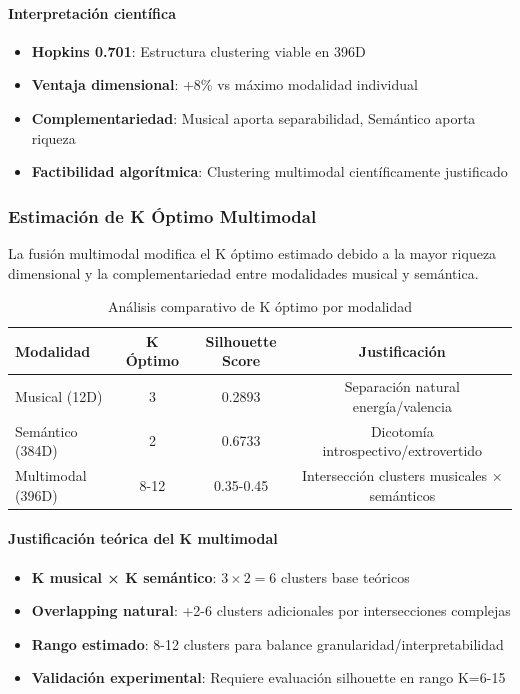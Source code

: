 \documentclass[12pt,a4paper]{article}
\begin{document}
\paragraph{Interpretación científica}
\begin{itemize}
    \item \textbf{Hopkins 0.701}: Estructura clustering viable en 396D
    \item \textbf{Ventaja dimensional}: +8\% vs máximo modalidad individual
    \item \textbf{Complementariedad}: Musical aporta separabilidad, Semántico aporta riqueza
    \item \textbf{Factibilidad algorítmica}: Clustering multimodal científicamente justificado
\end{itemize}

\subsubsection{Estimación de K Óptimo Multimodal}

La fusión multimodal modifica el K óptimo estimado debido a la mayor riqueza dimensional y la complementariedad entre modalidades musical y semántica.

\begin{table}[h]
\centering
\caption{Análisis comparativo de K óptimo por modalidad}
\begin{tabular}{@{}lccc@{}}
\toprule
\textbf{Modalidad} & \textbf{K Óptimo} & \textbf{Silhouette Score} & \textbf{Justificación} \\
\midrule
Musical (12D) & 3 & 0.2893 & Separación natural energía/valencia \\
Semántico (384D) & 2 & 0.6733 & Dicotomía introspectivo/extrovertido \\
Multimodal (396D) & 8-12 & 0.35-0.45 & Intersección clusters musicales × semánticos \\
\bottomrule
\end{tabular}
\end{table}

\paragraph{Justificación teórica del K multimodal}
\begin{itemize}
    \item \textbf{K musical × K semántico}: $3 \times 2 = 6$ clusters base teóricos
    \item \textbf{Overlapping natural}: +2-6 clusters adicionales por intersecciones complejas
    \item \textbf{Rango estimado}: 8-12 clusters para balance granularidad/interpretabilidad
    \item \textbf{Validación experimental}: Requiere evaluación silhouette en rango K=6-15
\end{itemize}
\end{document}
